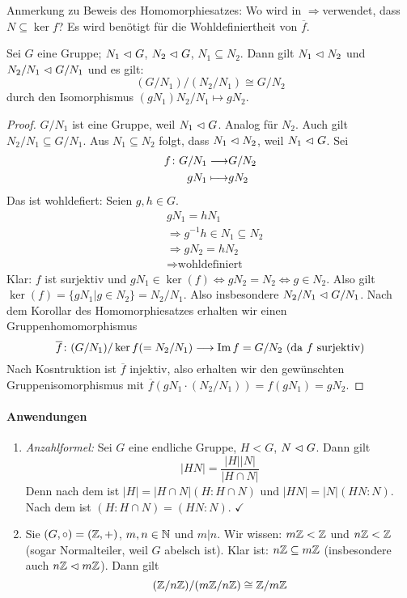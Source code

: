 \documentclass[12pt,a4paper]{scrartcl}
\begin{document}
\noindent Anmerkung zu Beweis des Homomorphiesatzes: Wo wird in \glqq$\Rightarrow$\grqq verwendet, dass $N\subseteq \ker f$? Es wird benötigt für die Wohldefiniertheit von $\overline{f}$.

\begin{satz}[2. Isomorphiesatz] \label{thm:iso2_g}
	Sei $G$ eine Gruppe; $N_1\vartriangleleft G$, $N_2\vartriangleleft G$, $N_1\subseteq N_2$. Dann gilt $N_1\vartriangleleft N_2$ und $N_2/N_1\vartriangleleft G/N_1$ und es gilt:
	$$(G/N_1)/(N_2/N_1) \cong G/N_2$$ durch den Isomorphismus $(gN_1)N_2/N_1\mapsto gN_2$.
\end{satz}	

\begin{proof}
	$G/N_1$ ist eine Gruppe, weil $N_1\vartriangleleft G$. Analog für $N_2$. Auch gilt $N_2/N_1\subseteq G/N_1$. Aus $N_1\subseteq N_2$ folgt, dass $N_1\vartriangleleft N_2$, weil $N_1\vartriangleleft G$. Sei
	\begin{align*}
		f\colon G/N_1  \longrightarrow &G/N_2\\
		gN_1  \longmapsto & gN_2
	\end{align*}
	Das ist wohldefiert: Seien $g, h\in G$.
	\begin{align*}
		&gN_1 = hN_1 \\
		&\Rightarrow g^{-1}h\in N_1\subseteq N_2 \\
		&\Rightarrow gN_2 = hN_2 \\
		&\Rightarrow \text{wohldefiniert}
	\end{align*}
	Klar: $f$ ist surjektiv und $gN_1\in \ker(f)\Leftrightarrow gN_2 = N_2\Leftrightarrow g\in N_2$. Also gilt $\ker(f) = \{gN_1|g\in N_2\} = N_2/N_1$. Also insbesondere $N_2/N_1\vartriangleleft G/N_1$.
	Nach dem Korollar des Homomorphiesatzes erhalten wir einen Gruppenhomomorphismus
	$$ \overline{f}\colon (G/N_1)/\operatorname{ker} f(=N_2/N_1)\longrightarrow \operatorname{Im} f = G/N_2 \mbox{ (da $f$ surjektiv)}$$
	Nach Kosntruktion ist $\overline{f}$ injektiv, also erhalten wir den gewünschten Gruppenisomorphismus mit $\overline{f}(gN_1\cdot (N_2/N_1)) = f(gN_1) = gN_2$.
\end{proof}

\paragraph{Anwendungen}
\begin{enumerate}
	\item \textit{Anzahlformel:} Sei $G$ eine endliche Gruppe, $H<G$, $N\vartriangleleft G$. Dann gilt $$|HN| =\frac{ |H||N|}{|H\cap N|}$$ 
	Denn nach dem  ist $|H| = |H\cap N|(H:H\cap N)$ und $|HN| = |N|(HN:N)$. Nach dem  ist $(H:H\cap N)=(HN:N)$. \hfill $\checkmark$
	\item Sie $(G,\circ) = (\mathbb Z, +)$, $m,n\in\mathbb N$ und $m|n$. Wir wissen: $m\mathbb Z<\mathbb Z$ und $n\mathbb Z<\mathbb Z$ (sogar Normalteiler, weil $G$ abelsch ist). Klar ist: $n\mathbb Z\subseteq m\mathbb Z$ (insbesondere auch $n\mathbb Z\vartriangleleft m\mathbb Z$). Dann gilt 
	$$(\mathbb Z/n\mathbb Z)/(m\mathbb Z/n\mathbb Z) \cong \mathbb Z/m\mathbb Z$$
\end{enumerate}
\end{document}
